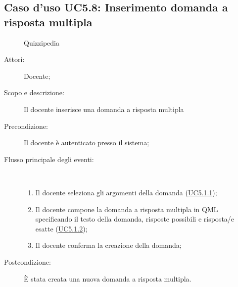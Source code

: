 \subsection{Caso d'uso UC5.8: Inserimento domanda a risposta multipla}
	\begin{figure}[H]
		\centering
		\begin{resizedtikzpicture}{\textwidth}
		\begin{umlsystem}[x=0, fill=lightgray!20]{Quizzipedia}
		\end{umlsystem}
		\end{resizedtikzpicture}
		\caption{}
	\end{figure}
\begin{description}
\item[Attori:] Docente;
\item[Scopo e descrizione:] Il docente inserisce una domanda a risposta multipla
      \item[Precondizione:] Il docente è autenticato presso il sistema;

        \item[Flusso principale degli eventi:] \ 
 \begin{enumerate}
          \item Il docente seleziona gli argomenti della domanda (\hyperlink{UC5.1.1}{UC5.1.1});
          \item Il docente compone la domanda a risposta multipla in QML specificando il testo della domanda, risposte possibili e risposta/e esatte (\hyperlink{UC5.1.2}{UC5.1.2});
          \item Il docente conferma la creazione della domanda;

      \end{enumerate}
    \item[Postcondizione:] È stata creata una nuova domanda a risposta multipla.
  \end{description}
\hypertarget{UC5.9}{}
